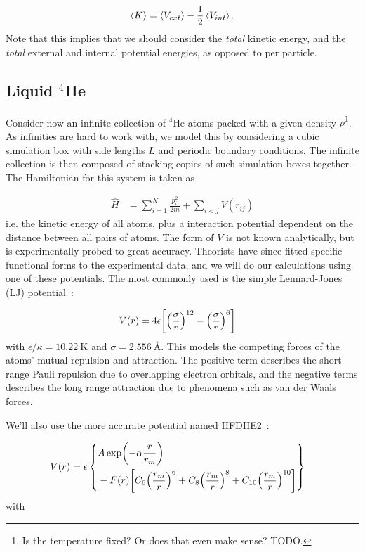 \documentclass[Thesis.tex]{subfiles}
\begin{document}
\begin{align}
    \expval{K} = \expval{V_{ext}} -
    \frac{1}{2}\expval{V_{int}}.\label{eq:virial-result}
\end{align}
Note that this implies that we should consider the \emph{total} kinetic
energy, and the \emph{total} external and internal potential energies, as opposed to per
particle. 


\subsection{Liquid $^4$He}

Consider now an infinite collection of $^4$He atoms packed with a given density
$\rho$\footnote{Is the temperature fixed? Or does that even make sense? TODO.}. As
infinities are hard to work with, we model this by considering a cubic simulation box with
side lengths $L$ and periodic boundary conditions. The infinite collection is then
composed of stacking copies of such simulation boxes together. The Hamiltonian for this
system is taken as

\begin{align}
    \hat H &= \sum_{i=1}^N \frac{p_i^2}{2m} + \sum_{i < j} V(r_{ij})
\end{align}
i.e. the kinetic energy of all atoms, plus a interaction potential dependent on the
distance between all pairs of atoms. The form of $V$ is not known analytically, but is
experimentally probed to great accuracy. Theorists have since fitted specific functional
forms to the experimental data, and we will do our calculations using one of these
potentials. The most commonly used is the simple Lennard-Jones (LJ)
potential~\cite{Kalos-1981}:

\begin{align}
    \label{eq:Lennard-Jones-def}
    V(r)
     &= 4\epsilon\qty[\qty( \frac{\sigma}{r} )^{12} - \qty( \frac{\sigma}{r} )^6 ]
\end{align}
with $\epsilon/\kappa = \SI{10.22}{\K}$ and $\sigma = \SI{2.556}{\angstrom}$. This
models the competing forces of the atoms' mutual repulsion and attraction. The
positive term describes the short range Pauli repulsion due to overlapping
electron orbitals, and the negative terms describes the long range attraction
due to phenomena such as van der Waals forces.

We'll also use the more accurate potential named HFDHE2~\cite{Kalos-1981}:

\begin{align}
    \label{eq:HFDHE2-def} 
    V(r) &= \epsilon 
    \left\{\!\begin{aligned}
        &A \exp(-\alpha \frac{r }{ r_m})\\
        &- F(r) \qty[ C_6  \qty(\frac{r_m }{ r})^6 + C_8  \qty(\frac{r_m }{ r})^8 + C_{10} \qty(\frac{r_m }{ r})^{10}]
    \end{aligned}\right\}
\end{align}
with
\end{document}
